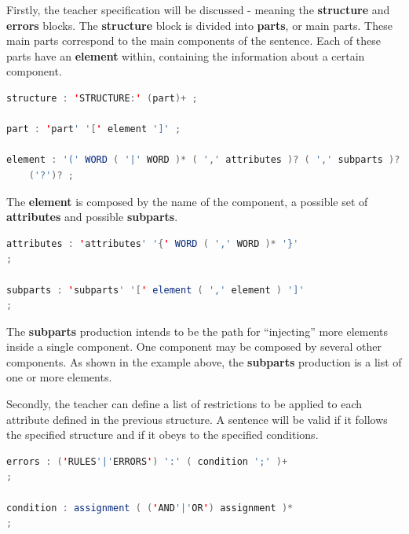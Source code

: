 Firstly, the teacher specification will be discussed - meaning the \textbf{structure} and \textbf{errors} blocks.
The \textbf{structure} block is divided into \textbf{parts}, or main parts. These main parts correspond to the main components of the sentence. Each of these parts have an \textbf{element} within, containing the information about a certain component.

\begin{center}
\begin{minipage}{14cm}
\begin{lstlisting}[language=java, basicstyle=\small, label={lst:dsl_struct_prod}, caption=DSL structure/part/element productions]
structure : 'STRUCTURE:' (part)+ ;

part : 'part' '[' element ']' ;

element : '(' WORD ( '|' WORD )* ( ',' attributes )? ( ',' subparts )? ')' 
    ('?')? ;
\end{lstlisting}
\end{minipage}
\end{center}

The \textbf{element} is composed by the name of the component, a possible set of \textbf{attributes} and possible \textbf{subparts}.

\begin{center}
\begin{minipage}{13cm}
\begin{lstlisting}[language=java, basicstyle=\small, label={lst:dsl_attrs_prod}, caption=DSL attributes/subparts productions]
attributes : 'attributes' '{' WORD ( ',' WORD )* '}'
;

subparts : 'subparts' '[' element ( ',' element ) ']'
;
\end{lstlisting}
\end{minipage}
\end{center}

The \textbf{subparts} production intends to be the path for ``injecting'' more elements inside a single component. One component may be composed by several other components. As shown in the example above, the \textbf{subparts} production is a list of one or more elements.

Secondly, the teacher can define a list of restrictions to be applied to each attribute defined in the previous structure. A sentence will be valid if it follows the specified structure and if it obeys to the specified conditions.

\begin{center}
\begin{minipage}{12cm}
\begin{lstlisting}[language=java, basicstyle=\small, label={lst:dsl_errors_prod}, caption=DSL errors/expression productions]
errors : ('RULES'|'ERRORS') ':' ( condition ';' )+
;

condition : assignment ( ('AND'|'OR') assignment )*
;
\end{lstlisting}
\end{minipage}
\end{center}

